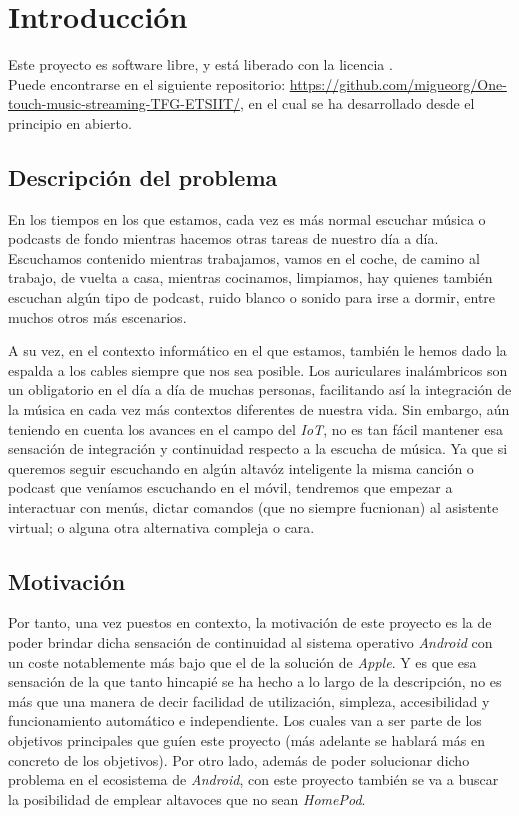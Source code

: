 \chapter{Introducción}

Este proyecto es software libre, y está liberado con la licencia \cite{gplv3}.\\

Puede encontrarse en el siguiente repositorio:
\url{https://github.com/migueorg/One-touch-music-streaming-TFG-ETSIIT/}, en el
cual se ha desarrollado desde el principio en abierto.

\section{Descripción del problema}
En los tiempos en los que estamos, cada vez es más normal escuchar música o
podcasts de fondo mientras hacemos otras tareas de nuestro día a día. Escuchamos
contenido mientras trabajamos, vamos en el coche, de camino al trabajo, de
vuelta a casa, mientras cocinamos, limpiamos, hay quienes también escuchan algún
tipo de podcast, ruido blanco o sonido para irse a dormir, entre muchos otros
más escenarios. 

A su vez, en el contexto informático en el que estamos, también le hemos dado la
espalda a los cables siempre que nos sea posible. Los auriculares inalámbricos
son un obligatorio en el día a día de muchas personas, facilitando así la
integración de la música en cada vez más contextos diferentes de nuestra vida.
Sin embargo, aún teniendo en cuenta los avances en el campo del \emph{IoT}, no
es tan fácil mantener esa sensación de integración y continuidad respecto a la
escucha de música. Ya que si queremos seguir escuchando en algún altavóz
inteligente la misma canción o podcast que veníamos escuchando en el móvil,
tendremos que empezar a interactuar con menús, dictar comandos (que no siempre
fucnionan) al asistente virtual; o alguna otra alternativa compleja o cara.\\

\section{Motivación}
Por tanto, una vez puestos en contexto, la motivación de este proyecto es la de
poder brindar dicha sensación de continuidad al sistema operativo \emph{Android}
con un coste notablemente más bajo que el de la solución de \emph{Apple}. Y es
que esa sensación de la que tanto hincapié se ha hecho a lo largo de la
descripción, no es más que una manera de decir facilidad de utilización,
simpleza, accesibilidad y funcionamiento automático e independiente. Los cuales
van a ser parte de los objetivos principales que guíen este proyecto (más
adelante se hablará más en concreto de los objetivos). Por otro lado, además de
poder solucionar dicho problema en el ecosistema de \emph{Android}, con este
proyecto también se va a buscar la posibilidad de emplear altavoces que no sean
\emph{HomePod}. 

